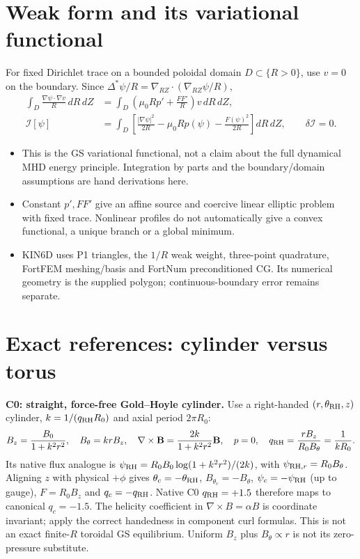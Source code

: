 \documentclass[11pt,a4paper]{article}
\newcommand{\ds}{\Delta^*}
\newcommand{\pp}{p'}
\begin{document}
\section*{Weak form and its variational functional}
For fixed Dirichlet trace on a bounded poloidal domain $D\subset\{R>0\}$, use $v=0$ on the boundary. Since $\ds\psi/R=\nabla_{RZ}\cdot(\nabla_{RZ}\psi/R)$,
\begin{align*}
\int_D\frac{\nabla\psi\cdot\nabla v}{R}\,dR\,dZ
&=\int_D\left(\mu_0R\pp+\frac{FF'}R\right)v\,dR\,dZ,\\
\mathcal I[\psi]&=\int_D\left[\frac{|\nabla\psi|^2}{2R}-\mu_0Rp(\psi)-\frac{F(\psi)^2}{2R}\right]dR\,dZ,
\qquad\delta\mathcal I=0.
\end{align*}
\begin{itemize}
\item This is the GS variational functional, not a claim about the full dynamical MHD energy principle. Integration by parts and the boundary/domain assumptions are hand derivations here.
\item Constant $\pp,FF'$ give an affine source and coercive linear elliptic problem with fixed trace. Nonlinear profiles do not automatically give a convex functional, a unique branch or a global minimum.
\item KIN6D uses P1 triangles, the $1/R$ weak weight, three-point quadrature, FortFEM meshing/basis and FortNum preconditioned CG. Its numerical geometry is the supplied polygon; continuous-boundary error remains separate.
\end{itemize}

\section*{Exact references: cylinder versus torus}
\textbf{C0: straight, force-free Gold--Hoyle cylinder.} Use a right-handed $(r,\theta_{\rm RH},z)$ cylinder, $k=1/(q_{\rm RH}R_0)$ and axial period $2\pi R_0$:
\[
 B_z=\frac{B_0}{1+k^2r^2},\quad B_\theta=krB_z,\quad
 \nabla\times\mathbf B=\frac{2k}{1+k^2r^2}\mathbf B,\quad p=0,
 \quad q_{\rm RH}=\frac{rB_z}{R_0B_\theta}=\frac1{kR_0}.
\]
Its native flux analogue is $\psi_{\rm RH}=R_0B_0\log(1+k^2r^2)/(2k)$, with $\psi_{{\rm RH},r}=R_0B_\theta$. Aligning $z$ with physical $+\phi$ gives $\theta_c=-\theta_{\rm RH}$, $B_{\theta_c}=-B_\theta$, $\psi_c=-\psi_{\rm RH}$ (up to gauge), $F=R_0B_z$ and $q_c=-q_{\rm RH}$. Native C0 $q_{\rm RH}=+1.5$ therefore maps to canonical $q_c=-1.5$. The helicity coefficient in $\nabla\times B=\alpha B$ is coordinate invariant; apply the correct handedness in component curl formulas. This is not an exact finite-$R$ toroidal GS equilibrium. Uniform $B_z$ plus $B_\theta\propto r$ is not its zero-pressure substitute.
\end{document}
